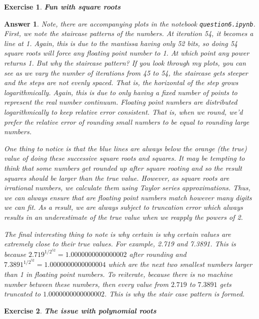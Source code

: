 \documentclass[12pt]{article}
\theoremstyle{colon}
\newtheorem{exercise}{Exercise}
\newtheorem*{answer}{Answer}
\begin{document}
\clearpage

\begin{exercise}
  \textbf{Fun with square roots}
\end{exercise}

\begin{answer}
  Note, there are accompanying plots in the notebook \texttt{question6.ipynb}. First, we note the staircase patterns of the numbers. At iteration 54, it becomes a line at 1. Again, this is due to the mantissa having only 52 bits, so doing 54 square roots will force any floating point number to 1. At which point any power returns 1. But why the staircase pattern? If you look through my plots, you can see as we vary the number of iterations from 45 to 54, the staircase gets steeper and the steps are not evenly spaced. That is, the horizontal of the step grows logarithmically. Again, this is due to only having a fixed number of points to represent the real number continuum. Floating point numbers are distributed logarithmically to keep relative error consistent. That is, when we round, we'd prefer the relative error of rounding small numbers to be equal to rounding large numbers.

  One thing to notice is that the blue lines are always below the orange (the true) value of doing these successive square roots and squares. It may be tempting to think that some numbers get rounded up after square rooting and so the result squares should be larger than the true value. However, as square roots are irrational numbers, we calculate them using Taylor series approximations. Thus, we can always ensure that are floating point numbers match however many digits we can fit. As a result, we are always subject to truncation error which always results in an underestimate of the true value when we reapply the powers of 2.

  The final interesting thing to note is why certain is why certain values are extremely close to their true values. For example, 2.719 and 7.3891. This is because $2.719^{1/2^{52}} = 1.0000000000000002$ after rounding and $7.3891^{1/2^{52}} = 1.0000000000000004$ which are the next two smallest numbers larger than 1 in floating point numbers. To reiterate, because there is no machine number between these numbers, then every value from $2.719$ to $7.3891$ gets truncated to $1.0000000000000002$. This is why the stair case pattern is formed.
\end{answer}

\clearpage

\begin{exercise}
  \textbf{The issue with polynomial roots}
\end{exercise}
\end{document}
